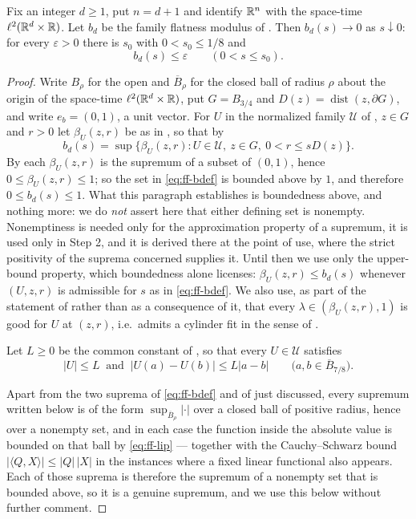 \begin{lemma}
Fix an integer $d\ge1$, put $n=d+1$ and identify $\mathbb{R}^n$ with the space-time
$\ell^2(\mathbb{R}^d\times\mathbb{R})$. Let $b_d$ be the family flatness modulus of
. Then $b_d(s)\to0$ as $s\downarrow0$: for every
$\varepsilon>0$ there is $s_0$ with $0<s_0\le1/8$ and
\[
  b_d(s)\le\varepsilon\qquad(0<s\le s_0).
\]
\end{lemma}
\begin{proof}
Write $B_\rho$ for the open and $\overline B_\rho$ for the closed ball of radius
$\rho$ about the origin of the space-time $\ell^2(\mathbb{R}^d\times\mathbb{R})$, put
$G=B_{3/4}$ and $D(z)=\operatorname{dist}(z,\partial G)$, and write
$e_b=(0,1)$, a unit vector. For $U$ in the normalized family $\mathcal U$ of
, $z\in G$ and $r>0$ let $\beta_U(z,r)$ be as in
, so that by 
\begin{equation}\label{eq:ff-bdef}
  b_d(s)=\sup\bigl\{\beta_U(z,r):U\in\mathcal U,\ z\in G,\ 0<r\le sD(z)\bigr\}.
\end{equation}
By  each $\beta_U(z,r)$ is the supremum of a subset of
$(0,1)$, hence $0\le\beta_U(z,r)\le1$; so the set in \eqref{eq:ff-bdef} is
bounded above by $1$, and therefore $0\le b_d(s)\le1$. What this paragraph
establishes is boundedness above, and nothing more: we do \emph{not} assert here
that either defining set is nonempty. Nonemptiness is needed only for the
approximation property of a supremum, it is used only in Step 2, and it is
derived there at the point of use, where the strict positivity of the suprema
concerned supplies it. Until then we use only the upper-bound property, which
boundedness alone licenses: $\beta_U(z,r)\le b_d(s)$ whenever $(U,z,r)$ is
admissible for $s$ as in \eqref{eq:ff-bdef}. We also use, as part of the
statement of  rather than as a consequence of it, that
every $\lambda\in(\beta_U(z,r),1)$ is good for $U$ at $(z,r)$, i.e.\ admits a
cylinder fit in the sense of .

Let $L\ge0$ be the common constant of , so
that every $U\in\mathcal U$ satisfies
\begin{equation}\label{eq:ff-lip}
  |U|\le L\ \text{ and }\
  |U(a)-U(b)|\le L|a-b|\qquad\bigl(a,b\in\overline B_{7/8}\bigr).
\end{equation}

Apart from the two suprema of \eqref{eq:ff-bdef} and of 
just discussed, every supremum written below is of the form
$\sup_{\overline B_\rho}|\cdot|$ over a closed ball of positive radius, hence
over a nonempty set, and in each case the function inside the absolute value is
bounded on that ball by \eqref{eq:ff-lip} --- together with the Cauchy--Schwarz
bound $|\langle Q,X\rangle|\le|Q|\,|X|$ in the instances where a fixed linear
functional also appears. Each of those suprema is therefore the supremum of a
nonempty set that is bounded above, so it is a genuine supremum, and we use this
below without further comment.


\end{proof}
